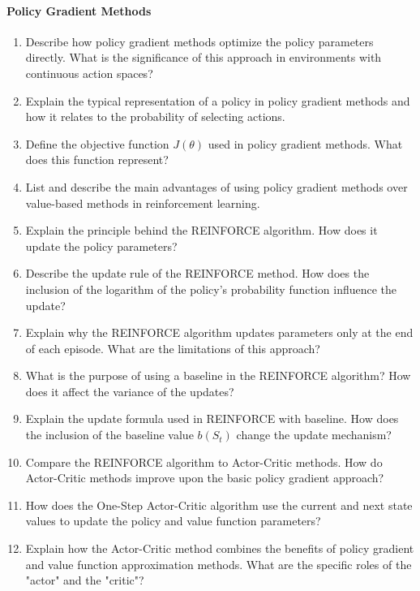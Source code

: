 \paragraph*{Policy Gradient Methods}

\begin{enumerate}

	\item Describe how policy gradient methods optimize the policy parameters directly. What is the significance of this approach in environments with continuous action spaces?
    \item Explain the typical representation of a policy in policy gradient methods and how it relates to the probability of selecting actions.
    \item Define the objective function $J(\theta)$ used in policy gradient methods. What does this function represent?
    \item List and describe the main advantages of using policy gradient methods over value-based methods in reinforcement learning.
    \item Explain the principle behind the REINFORCE algorithm. How does it update the policy parameters?
    \item Describe the update rule of the REINFORCE method. How does the inclusion of the logarithm of the policy's probability function influence the update?
    \item Explain why the REINFORCE algorithm updates parameters only at the end of each episode. What are the limitations of this approach?
    \item What is the purpose of using a baseline in the REINFORCE algorithm? How does it affect the variance of the updates?
    \item Explain the update formula used in REINFORCE with baseline. How does the inclusion of the baseline value $b(S_t)$ change the update mechanism?
    \item Compare the REINFORCE algorithm to Actor-Critic methods. How do Actor-Critic methods improve upon the basic policy gradient approach?
    \item How does the One-Step Actor-Critic algorithm use the current and next state values to update the policy and value function parameters?
    \item Explain how the Actor-Critic method combines the benefits of policy gradient and value function approximation methods. What are the specific roles of the "actor" and the "critic"?
\end{enumerate}
